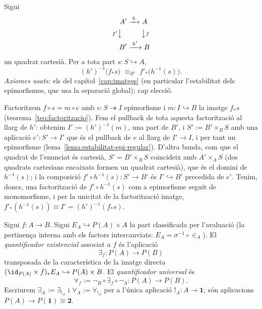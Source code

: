 \begin{lema}\label{lema:beck-chevalley}
Sigui
\[
\begin{aligned}
A' &\xrightarrow{\;h\;} A\\
{\scriptstyle f'}\big\downarrow\ \ &\qquad\big\downarrow{\scriptstyle f}\\
B' &\xrightarrow{\;h'\;} B
\end{aligned}
\]
un quadrat cartesià. Per a tota part \(s\colon S\hookrightarrow A\),
\[
(h')^{-1}\bigl(f_{*}s\bigr)\;\equiv_{B'}\;f'_{*}\bigl(h^{-1}(s)\bigr).
\]
\emph{Axiomes usats:} els del capítol~\ref{cap:imatges} (en particular
l'estabilitat dels epimorfismes, que usa la separació global); cap elecció.
\end{lema}

\begin{prova}
Factoritzem \(f\circ s=m\circ e\) amb \(e\colon S\twoheadrightarrow I\)
epimorfisme i \(m\colon I\hookrightarrow B\) la imatge \(f_*s\)
(teorema~\ref{teo:factoritzacio}). Fem el pullback de tota aquesta
factorització al llarg de \(h'\): obtenim \(I':=(h')^{-1}(m)\), una part
de \(B'\), i \(S':=B'\times_B S\) amb una aplicació \(e'\colon S'\to I'\)
que és el pullback de \(e\) al llarg de \(I'\to I\), i per tant un
epimorfisme (lema~\ref{lema:estabilitat-epi-regular}). D'altra banda,
com que el quadrat de l'enunciat és cartesià, \(S'=B'\times_BS\) coincideix
amb \(A'\times_AS\) (dos quadrats cartesians encaixats formen un quadrat
cartesià), que és el domini de \(h^{-1}(s)\); i la composició
\(f'\circ h^{-1}(s)\colon S'\to B'\) és \(I'\hookrightarrow B'\) precedida
de \(e'\). Tenim, doncs, una factorització de \(f'\circ h^{-1}(s)\) com a
epimorfisme seguit de monomorfisme, i per la unicitat de la factorització
imatge, \(f'_*(h^{-1}(s))\equiv I'=(h')^{-1}(f_*s)\).
\end{prova}

\begin{definicio}\label{def:quantificadors}
Sigui \(f\colon A\to B\). Sigui \(E_A\hookrightarrow P(A)\times A\) la
part classificada per l'avaluació (la pertinença interna amb els factors
intercanviats: \(E_A=\sigma^{-1}\circ{\in_A}\)). El \emph{quantificador
existencial} associat a \(f\) és l'aplicació
\[
\exists_f\colon P(A)\to P(B)
\]
transposada de la característica de la imatge directa
\((\id_{P(A)}\times f)_{*}E_A\hookrightarrow P(A)\times B\). El
\emph{quantificador universal} és
\[
\forall_f:=\neg_B\circ\exists_f\circ\neg_A\colon P(A)\to P(B).
\]
Escriurem \(\exists_A:=\exists_{{!}_A}\) i \(\forall_A:=\forall_{{!}_A}\)
per a l'única aplicació \({!}_A\colon A\to\mathbf1\); són aplicacions
\(P(A)\to P(\mathbf1)\cong\mathbf2\).
\end{definicio}

